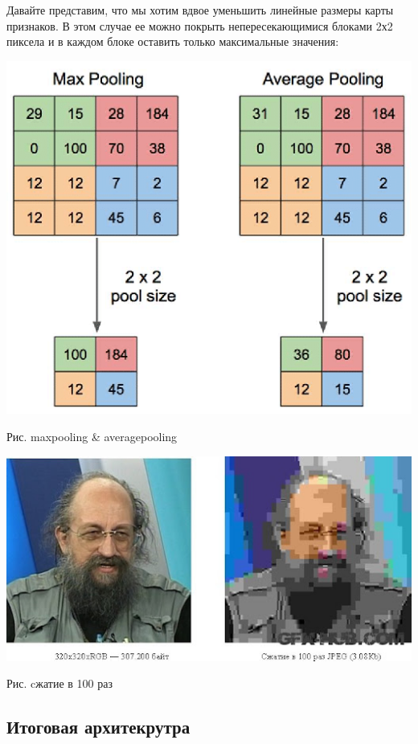 \documentclass{article}
\begin{document}
	Давайте представим, что мы хотим вдвое уменьшить линейные размеры карты признаков. В этом случае ее можно покрыть непересекающимися блоками 2х2 пиксела и в каждом блоке оставить только максимальные значения:
	
	\noindent \includegraphics[width=\textwidth]{pic15.png}
	\begin{center}
		Рис. maxpooling \& averagepooling
	\end{center}

	\noindent \includegraphics[width=\textwidth]{pic16.jpg}
	\begin{center}
		Рис. cжатие в 100 раз
	\end{center}

	\subsection{Итоговая архитекрутра}
	
\end{document}
